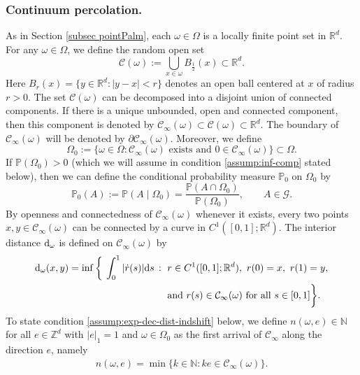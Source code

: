 \documentclass[11pt]{article}
\renewcommand{\d}{{\rm d}}
\newcommand{\R}{\mathbb R}
\newcommand{\N}{\mathbb N}
\newcommand{\Z}{\mathbb Z}
\renewcommand{\P}{\mathbb P}
\theoremstyle{rem}
\begin{document}
\subsubsection{Continuum percolation.}

As in Section \ref{subsec pointPalm}, each $\omega\in\Omega$ is a locally
finite point set in $\R^d$. For any $\omega\in \Omega$, we define the random
open set
\begin{equation}
  \label{eq:Def.Cinfty}
  \mathcal{C}(\omega):=\bigcup_{x\in \omega}B_{\frac 12}(x) \subset \R^d.
\end{equation}
Here $B_r(x)=\{y\in \R^d:|y-x|<r\}$ denotes an open ball centered at $x$ of
radius $r>0$. The set $\mathcal{C}(\omega)$ can be decomposed into a disjoint
union of connected components. If there is a unique unbounded, open and
connected component, then this component is denoted by
$\mathcal C_\infty(\omega)\subset \mathcal{C}(\omega) \subset \R^d$. The
boundary of $\mathcal C_\infty(\omega)$ will be denoted by
$\partial \mathcal{C}_\infty(\omega)$. Moreover, we define
\begin{equation}
  \label{eq:Omega.0}
  \Omega_0:=\big\{\omega\in \Omega\colon \mathcal C_\infty(\omega)
  \text{ exists and } 0\in \mathcal C_\infty(\omega) \big\} \subset \Omega.
\end{equation}
If $ \P(\Omega_0)>0$ (which we will assume in condition
\ref{assump:inf-comp} stated below), then we can define the conditional
probability measure $\P_0$ on $\Omega_0$ by
\[
\P_0(A):=\P(A\mid \Omega_0)
=
\frac{\P(A\cap \Omega_0)}{\P(\Omega_0)},
\qquad A\in \mathcal G.
\]
By openness and connectedness of $\mathcal C_\infty(\omega)$ whenever it exists,
every two points $x,y\in \mathcal C_\infty(\omega)$ can be connected by a curve
in $C^1([0,1];\R^d)$. The interior distance $\d_\omega$ is defined on
$\mathcal C_\infty(\omega)$ by
\begin{align}\label{def domega}
  \d_\omega(x,y)=\inf\bigg\{\:\int_0^1|\dot r(s)|\d s \,\, \colon
  &\; r\in C^1([0,1];\R^d), \
  r(0)=x,\ r(1)=y,  \\
&\;\text{and }  r(s) \in \mathcal C_\infty(\omega) \text{ for all }s \in [0,1]
\bigg\}.
\end{align}
To state condition \ref{assump:exp-dec-dist-indshift} below, we define
$n(\omega,e)\in \N$ for all $e\in \Z^d$ with $|e|_1=1$ and
$\omega\in\Omega_0$ as the first arrival of $\mathcal C_\infty$ along the
direction $e$, namely
\begin{align}
  \label{def-n}
  n(\omega,e)=\min\{k\in\N:k e\in{\mathcal C_\infty}(\omega)\}.
\end{align}
\end{document}
